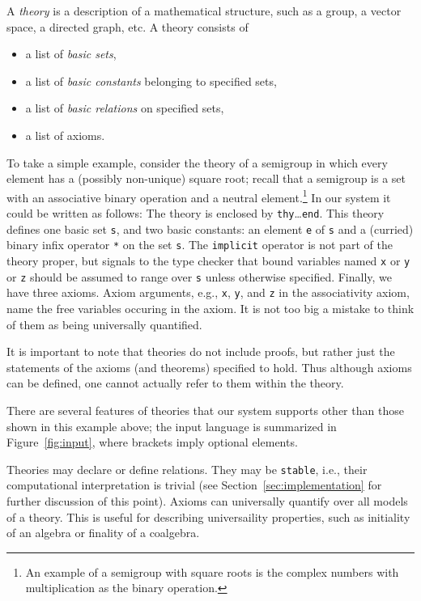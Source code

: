 A \emph{theory} is a description of a mathematical structure, such as
a group, a vector space, a directed graph, etc. A theory consists of
%
\begin{itemize}
\item a list of \emph{basic sets},
\item a list of \emph{basic constants} belonging to specified sets,
\item a list of \emph{basic relations} on specified sets,
\item a list of axioms.
\end{itemize}
%
To take a simple example, consider the theory of a semigroup in which
every element has a (possibly non-unique) square root; recall that a
semigroup is a set with an associative binary operation and a neutral
element.\footnote{An example of a semigroup with square roots is the
  complex numbers with multiplication as the binary operation.} In our
system it could be written as follows:
%
%
The theory is enclosed by \Verb|thy|\ldots\Verb|end|. This theory
defines one basic set \Verb|s|, and two basic constants: an element
\Verb|e| of \Verb|s| and a (curried) binary infix operator \Verb|*| on
the set \Verb|s|. The \Verb|implicit| operator is not part of the
theory proper, but signals to the type checker that bound
variables named \Verb|x| or \Verb|y| or \Verb|z| should be assumed to
range over \Verb|s| unless otherwise specified. Finally,
we have three axioms. Axiom arguments, e.g., \Verb|x|, \Verb|y|, and
\Verb|z| in the associativity axiom, name the free variables occuring
in the axiom. It is not too big a mistake to think of them as being
universally quantified.

It is important to note that theories do not include proofs, but
rather just the statements of the axioms (and theorems) specified to
hold. Thus although axioms can be defined, one cannot actually refer
to them within the theory.

There are several features of theories that our system supports other
than those shown in this example above; the input language is
summarized in Figure~\ref{fig:input}, where brackets imply optional
elements.


Theories may declare or define relations. They may be \Verb|stable|,
i.e., their computational interpretation is trivial (see
Section~\ref{sec:implementation} for further discussion of this
point). Axioms can universally quantify over all models of a theory.
This is useful for describing universaility properties, such as
initiality of an algebra or finality of a coalgebra.
  
